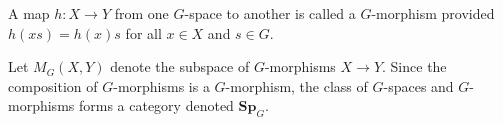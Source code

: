 A map $h: X \rightarrow Y$ from one $G$-space to another is called a $G$-morphism provided $h(xs) = h(x)s$ for all $x \in X$ and $s \in G$.

Let $M_G(X, Y)$ denote the subspace of $G$-morphisms $X \rightarrow Y$. Since the composition of $G$-morphisms is a $G$-morphism, the class of $G$-spaces and $G$-morphisms forms a category denoted $\mathbf{Sp}_G$.
